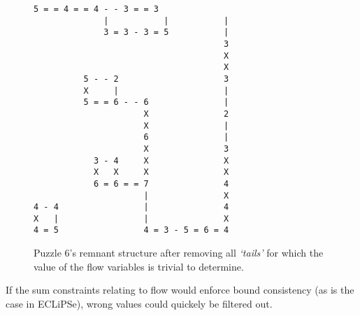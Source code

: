 \begin{figure}
\centering
\begin{BVerbatim}[fontsize=\footnotesize]
              5 = = 4 = = 4 - - 3 = = 3
              |           |           |
              3 = 3 - 3 = 5           |
                                      3
                                      X
                                      X
          5 - - 2                     3
          X     |                     |
          5 = = 6 - - 6               |
                      X               2
                      X               |
                      6               |
                      X               3
            3 - 4     X               X
            X   X     X               X
            6 = 6 = = 7               4
                      |               X
4 - 4                 |               4
X   |                 |               X
4 = 5                 4 = 3 - 5 = 6 = 4
\end{BVerbatim}
\caption{Puzzle 6's remnant structure after removing all \textit{`tails'} for which the value of the flow variables is trivial to determine.}
\label{fig:circles}
\end{figure}

If the sum constraints relating to flow would enforce bound consistency (as is the case in ECLiPSe), wrong values could quickely be filtered out. 